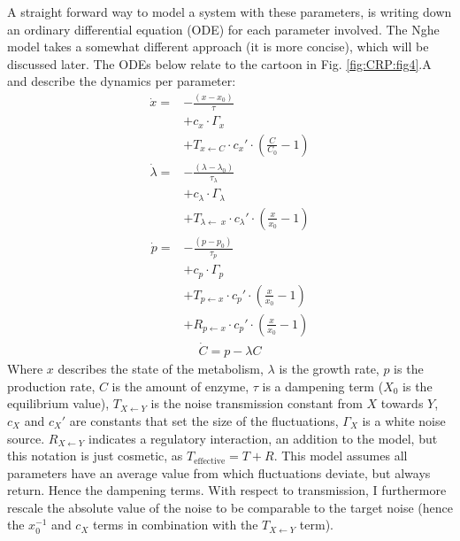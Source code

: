 A straight forward way to model a system with these parameters, is writing down an ordinary differential equation (ODE) for each parameter involved. 
%
The Nghe model takes a somewhat different approach (it is more concise), which will be discussed later.
%
The ODEs below relate to the cartoon in Fig. \ref{fig:CRP:fig4}.A
and describe the dynamics per parameter:
%
\begin{align}
\label{myfirstequation}
\dot{x} = & - \frac{(x-x_0)}{\tau}  \nonumber \\ 
          & + c_x \cdot \Gamma_x  \nonumber \\ %
          & + T_{x\leftarrow C} \cdot c_x' \cdot (\frac{C}{C_0} - 1)  
\end{align}
%
%
\begin{align}
	\dot{\lambda} = & -\frac{(\lambda - \lambda_0 )}{\tau_\lambda} \nonumber \\ 
 			& + c_\lambda \cdot \Gamma_\lambda \nonumber \\  %
			& + T_{\lambda\leftarrow\ x} \cdot c_\lambda' \cdot (\frac{x}{x_0}-1) 
\end{align}
%
\begin{align}
\label{mythirdequation}
\dot{p} = & - \frac{(p-p_0)}{\tau_p} \nonumber \\ 
		 & + c_p \cdot \Gamma_p \nonumber \\ 
         & + T_{p\leftarrow x} \cdot c_p' \cdot (\frac{x}{x_0}-1)  \nonumber \\ 
         & + R_{p\leftarrow x} \cdot c_p' \cdot (\frac{x}{x_0}-1)
\end{align}
%
\begin{align}
\label{mylastequation}
\dot{C} = p - \lambda C
\end{align}
%
Where $x$ describes the state of the metabolism, $\lambda$ is the growth rate, $p$ is the production rate, $C$ is the amount of enzyme, $\tau$ is a dampening term ($X_0$ is the equilibrium value), $T_{X \leftarrow Y}$ is the noise transmission constant from $X$ towards $Y$, $c_X$ and $c_X'$ are constants that set the size of the fluctuations, $\Gamma_X$ is a white noise source.
$R_{X \leftarrow Y}$ indicates a regulatory interaction, an addition to the model, but this notation is just cosmetic, as $T_\text{effective}=T+R$.
%
This model assumes all parameters have an average value from which fluctuations deviate, but always return. Hence the dampening terms.
With respect to transmission, I furthermore rescale the absolute value of the noise to be comparable to the target noise (hence the $x_0^{-1}$ and $c_X$ terms in combination with the $T_{X\leftarrow Y}$ term).

